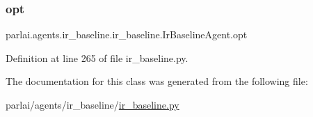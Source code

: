 \subsubsection{\texorpdfstring{opt}{opt}}
{\footnotesize\ttfamily parlai.\+agents.\+ir\+\_\+baseline.\+ir\+\_\+baseline.\+Ir\+Baseline\+Agent.\+opt}



Definition at line 265 of file ir\+\_\+baseline.\+py.



The documentation for this class was generated from the following file\+:\begin{DoxyCompactItemize}
\item 
parlai/agents/ir\+\_\+baseline/\hyperlink{ir__baseline_8py}{ir\+\_\+baseline.\+py}\end{DoxyCompactItemize}
